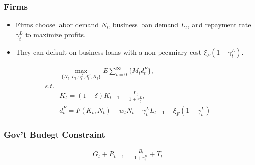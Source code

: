 \documentclass[10pt]{beamer}
\begin{document}
\begin{frame}
  \frametitle{Firms}
  \begin{itemize}
    \item Firms choose labor demand $N_t$, business loan demand $L_t$, and repayment rate $\gamma_t^L$ to maximize profits. 
    \item They can default on business loans with a non-pecuniary cost $\xi_F(1-\gamma_t^L)$.
  \end{itemize}
  \begin{align}
    &\max_{\{N_t, L_t, \gamma_t^L, d_t^F, K_t\}} E \sum_{t=0}^{\infty} \{ M_t d_t^F \} ,\\
    s.t. \nonumber \\
    &K_t=(1-\delta)K_{t-1}+\frac{L_t}{1+r_t^L}, \\
    &d_t^F=F(K_t, N_t)-w_tN_t-\gamma_t^L L_{t-1}-\xi_F(1-\gamma_t^L)
  \end{align}
\end{frame}

\begin{frame}
  \frametitle{Gov't Budegt Constraint}
  \begin{align}
    G_t+B_{t-1}=\frac{B_t}{1+r_t^B}+T_t
  \end{align}
\end{frame}
\end{document}
